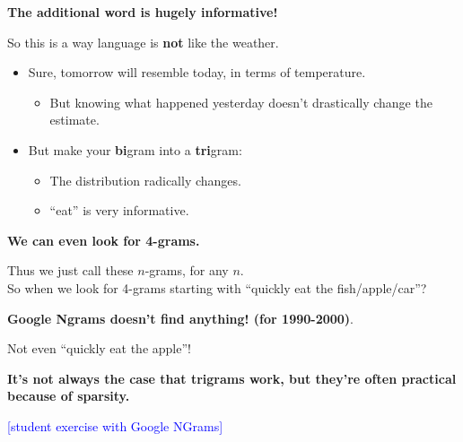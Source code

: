 \documentclass{beamer}
\newcommand{\pagestepalt}[2]{
  \begin{frame}[t]
    \begin{minipage}[t][0.26\textheight][t]{\textwidth}
      \begin{center}
        \huge
        \textbf{#1}
      \end{center}
    \end{minipage}
    
    \begin{minipage}[t][0.7\textheight][t]{\textwidth}
      #2
    \end{minipage}
  \end{frame}
}
\begin{document}
\pagestepalt{The additional word is hugely informative!}{
  So this is a way language is \textbf{not} like the weather.\pause
  \begin{itemize}
  \item Sure, tomorrow will resemble today, in terms of temperature.
    \begin{itemize}
    \item But knowing what happened yesterday  doesn't drastically
      change the estimate.
    \end{itemize}\pause
  \item But make your \alert{{\bf bi}gram} into a \alert{{\bf tri}gram}:
    \begin{itemize}
    \item The distribution radically changes.
    \item ``eat'' is very informative.
    \end{itemize}
  \end{itemize}
}

\pagestepalt{We can even look for \alert{4-grams}.}{
  Thus we just call these \alert{$n$-grams}, for any $n$. \\
  So when we look for 4-grams starting with ``quickly eat the fish/apple/car''? \pause
  \begin{center}
    \large\textbf{Google Ngrams doesn't find anything! (for 1990-2000)}.
  \end{center}\pause
  Not even ``quickly eat the apple''!\pause
  \begin{center}
    \textbf{It's not always the case that trigrams work, but they're often practical because of \alert{sparsity}.}
  \end{center}
  
  \textcolor{blue}{[student exercise with Google NGrams]}
}


  
\end{document}
